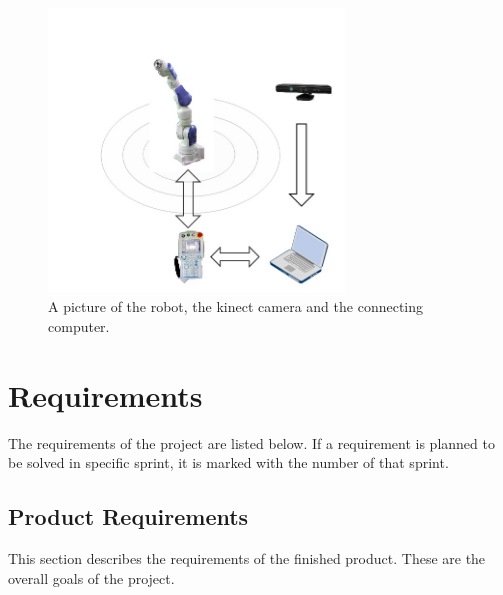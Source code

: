 \documentclass[10pt,a4paper]{article}
\begin{document}
\begin{figure}[H] 
  \centering
    \includegraphics[width = 0.7\textwidth]{robot.jpg}
    \caption{A picture of the robot, the kinect camera and the connecting computer.}
    \label{fig:safetyzone}
\end{figure}


\section{Requirements}
The requirements of the project are listed below. If a requirement is planned to be solved in specific sprint, it is marked with the number of that sprint. 
{\addtolength{\leftskip}{5mm}
\subsection{Product Requirements}
This section describes the requirements of the finished product. These are the overall goals of the project. \par}
\end{document}

